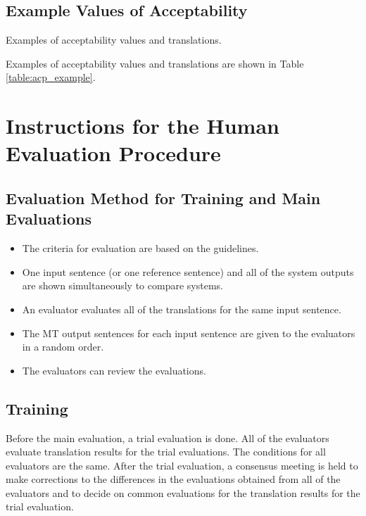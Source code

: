 \documentclass[english]{jnlp_1.4}
\begin{document}
\subsection{Example Values of Acceptability}
\label{sec:apn:acp_example}

\begin{table}[b]
\vspace{-0.5\Cvs}
\caption{Examples of acceptability values and translations.}

\end{table}

Examples of acceptability values and translations are shown in Table \ref{table:acp_example}.


\section{Instructions for the Human Evaluation Procedure}
\label{sec:apn:eval_procedure}


\subsection{Evaluation Method for Training and Main Evaluations}
\begin{itemize}
\item The criteria for evaluation are based on the guidelines.
\item One input sentence (or one reference sentence) and all of the system outputs are shown simultaneously to compare systems.
\item An evaluator evaluates all of the translations for the same input sentence. 
\item The MT output sentences for each input sentence are given to the evaluators in a random order.
\item The evaluators can review the evaluations.
\end{itemize}


\subsection{Training}

Before the main evaluation, a trial evaluation is done. 
All of the evaluators evaluate translation results for the trial evaluations. 
The conditions for all evaluators are the same. 
After the trial evaluation, a consensus meeting is held to make corrections to the differences in the evaluations obtained from all of the evaluators and to decide on common evaluations for the translation results for the trial evaluation.
\end{document}
